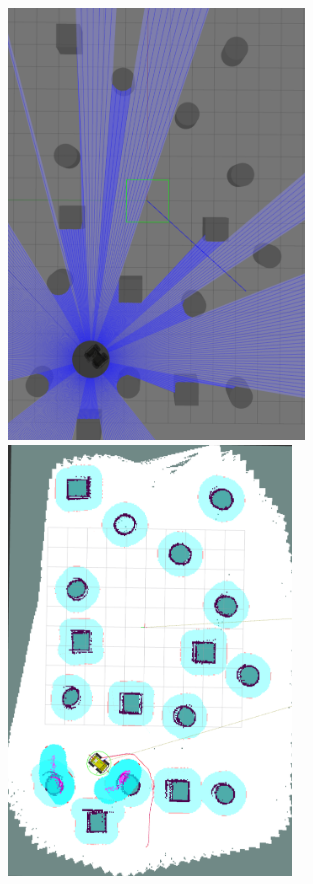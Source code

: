 \begin{figure}[htp!]
  \centering
  \begin{minipage}[b]{0.49\textwidth}
        \centering
        \includegraphics[width = 0.7\textwidth]{Figures/figNav2GazeboSim2.pdf}
  \end{minipage}
  \hfill
  \begin{minipage}[b]{0.49\textwidth}
    \centering
    \includegraphics[width = 0.67\textwidth]{Figures/figNav2MapSim2.pdf}

\end{minipage}
\end{figure}
